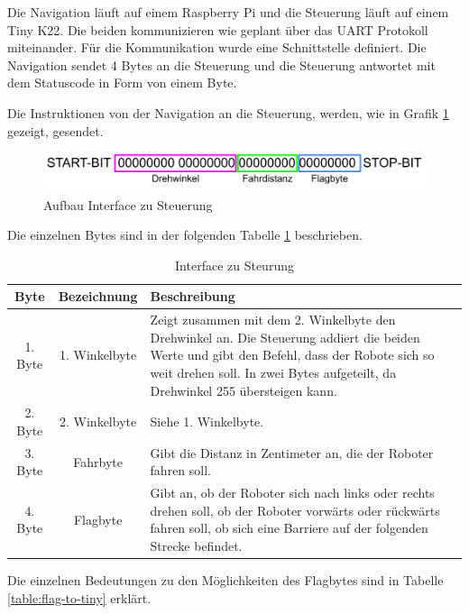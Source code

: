 Die Navigation läuft auf einem Raspberry Pi und die Steuerung läuft auf einem Tiny K22. Die beiden kommunizieren wie geplant über das UART Protokoll miteinander. Für die Kommunikation wurde eine Schnittstelle definiert. Die Navigation sendet 4 Bytes an die Steuerung und die Steuerung antwortet mit dem Statuscode in Form von einem Byte.

Die Instruktionen von der Navigation an die Steuerung, werden, wie in Grafik \ref{fig:interface-tiny} gezeigt, gesendet.

\begin{figure}[H]
\centering
\includegraphics[width=\textwidth]{assets/IT/interface-tiny.png}
\caption{Aufbau Interface zu Steuerung}
\label{fig:interface-tiny}
\end{figure}

Die einzelnen Bytes sind in der folgenden Tabelle \ref{table:interface-to-tiny} beschrieben.

\begin{table}[H]
\centering
\small
\begin{tabularx}{\textwidth}{|c|c|X|}
\hline
  \textbf{Byte} &\textbf{Bezeichnung} & \textbf{Beschreibung}\\
  \hline
      1. Byte&1. Winkelbyte &Zeigt zusammen mit dem 2. Winkelbyte den Drehwinkel an. Die Steuerung addiert die beiden Werte und gibt den Befehl, dass der Robote sich so weit drehen soll. In zwei Bytes aufgeteilt, da Drehwinkel 255 übersteigen kann.\\
  \hline
2. Byte&2. Winkelbyte&Siehe 1. Winkelbyte.\\
  \hline
  3. Byte&Fahrbyte&Gibt die Distanz in Zentimeter an, die der Roboter fahren soll.\\
  \hline
  4. Byte&Flagbyte&Gibt an, ob der Roboter sich nach links oder rechts drehen soll, ob der Roboter vorwärts oder rückwärts fahren soll, ob sich eine Barriere auf der folgenden Strecke befindet.\\
  \hline
  \end{tabularx}
\caption{Interface zu Steurung}
\label{table:interface-to-tiny}
\end{table}

Die einzelnen Bedeutungen zu den Möglichkeiten des Flagbytes sind in Tabelle \ref{table:flag-to-tiny} erklärt.

